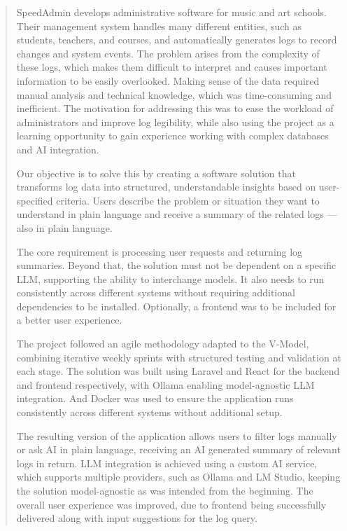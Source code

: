 \begin{abstract}
    SpeedAdmin develops administrative software for music and art schools. Their management system handles many different entities, such as students, teachers, and courses, and automatically generates logs to record changes and system events. The problem arises from the complexity of these logs, which makes them difficult to interpret and causes important information to be easily overlooked. Making sense of the data required manual analysis and technical knowledge, which was time-consuming and inefficient. The motivation for addressing this was to ease the workload of administrators and improve log legibility, while also using the project as a learning opportunity to gain experience working with complex databases and AI integration.

    Our objective is to solve this by creating a software solution that transforms log data into structured, understandable insights based on user-specified criteria. Users describe the problem or situation they want to understand in plain language and receive a summary of the related logs — also in plain language.

    The core requirement is processing user requests and returning log summaries. Beyond that, the solution must not be dependent on a specific LLM, supporting the ability to interchange models. It also needs to run consistently across different systems without requiring additional dependencies to be installed. Optionally, a frontend was to be included for a better user experience.

    The project followed an agile methodology adapted to the V-Model, combining iterative weekly sprints with structured testing and validation at each stage. The solution was built using Laravel and React for the backend and frontend respectively, with Ollama enabling model-agnostic LLM integration. And Docker was used to ensure the application runs consistently across different systems without additional setup.

    The resulting version of the application allows users to filter logs manually or ask AI in plain language, receiving an AI generated summary of relevant logs in return. LLM integration is achieved using a custom AI service, which supports multiple providers, such as Ollama and LM Studio, keeping the solution model-agnostic as was intended from the beginning. The overall user experience was improved, due to frontend being successfully delivered along with input suggestions for the log query.
\end{abstract}
\pagebreak
